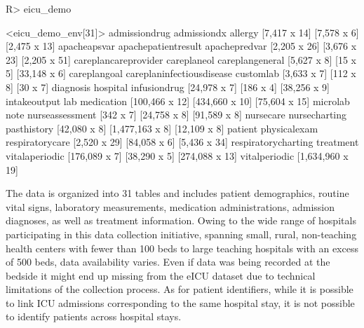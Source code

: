 \documentclass[
  notitle]{jss}
\begin{document}
\begin{CodeChunk}
\begin{CodeInput}
R> eicu_demo
\end{CodeInput}
\begin{CodeOutput}
<eicu_demo_env[31]>
            admissiondrug               admissiondx                   allergy 
             [7,417 x 14]               [7,578 x 6]              [2,475 x 13] 
             apacheapsvar       apachepatientresult             apachepredvar 
             [2,205 x 26]              [3,676 x 23]              [2,205 x 51] 
     careplancareprovider               careplaneol           careplangeneral 
              [5,627 x 8]                  [15 x 5]              [33,148 x 6] 
             careplangoal careplaninfectiousdisease                 customlab 
              [3,633 x 7]                 [112 x 8]                  [30 x 7] 
                diagnosis                  hospital              infusiondrug 
             [24,978 x 7]                 [186 x 4]              [38,256 x 9] 
             intakeoutput                       lab                medication 
           [100,466 x 12]            [434,660 x 10]             [75,604 x 15] 
                 microlab                      note           nurseassessment 
                [342 x 7]              [24,758 x 8]              [91,589 x 8] 
                nursecare             nursecharting               pasthistory 
             [42,080 x 8]           [1,477,163 x 8]              [12,109 x 8] 
                  patient              physicalexam           respiratorycare 
             [2,520 x 29]              [84,058 x 6]              [5,436 x 34] 
      respiratorycharting                 treatment            vitalaperiodic 
            [176,089 x 7]              [38,290 x 5]            [274,088 x 13] 
            vitalperiodic 
         [1,634,960 x 19] 
\end{CodeOutput}
\end{CodeChunk}

The data is organized into 31 tables and includes patient demographics,
routine vital signs, laboratory measurements, medication
administrations, admission diagnoses, as well as treatment information.
Owing to the wide range of hospitals participating in this data
collection initiative, spanning small, rural, non-teaching health
centers with fewer than 100 beds to large teaching hospitals with an
excess of 500 beds, data availability varies. Even if data was being
recorded at the bedside it might end up missing from the eICU dataset
due to technical limitations of the collection process. As for patient
identifiers, while it is possible to link ICU admissions corresponding
to the same hospital stay, it is not possible to identify patients
across hospital stays.
\end{document}
